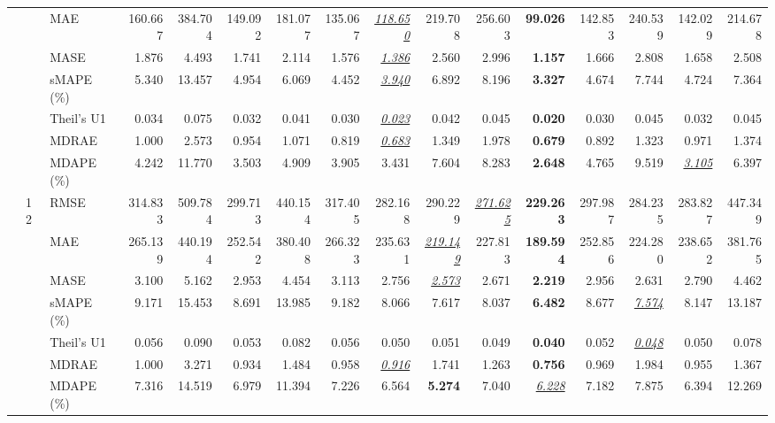 \begin{table}[!htbp]
{\begin{tabular}{lllrrrrrrrrrrrrr}
 &  & MAE & 160.667 & 384.704 & 149.092 & 181.077 & 135.067 & \underline{\textit{118.650}} & 219.708 & 256.603 & \textbf{99.026} & 142.853 & 240.539 & 142.029 & 214.678 \\
 &  & MASE & 1.876 & 4.493 & 1.741 & 2.114 & 1.576 & \underline{\textit{1.386}} & 2.560 & 2.996 & \textbf{1.157} & 1.666 & 2.808 & 1.658 & 2.508 \\
 &  & sMAPE (\%) & 5.340 & 13.457 & 4.954 & 6.069 & 4.452 & \underline{\textit{3.940}} & 6.892 & 8.196 & \textbf{3.327} & 4.674 & 7.744 & 4.724 & 7.364 \\
 &  & Theil's U1 & 0.034 & 0.075 & 0.032 & 0.041 & 0.030 & \underline{\textit{0.023}} & 0.042 & 0.045 & \textbf{0.020} & 0.030 & 0.045 & 0.032 & 0.045 \\
 &  & MDRAE & 1.000 & 2.573 & 0.954 & 1.071 & 0.819 & \underline{\textit{0.683}} & 1.349 & 1.978 & \textbf{0.679} & 0.892 & 1.323 & 0.971 & 1.374 \\
 &  & MDAPE (\%) & 4.242 & 11.770 & 3.503 & 4.909 & 3.905 & 3.431 & 7.604 & 8.283 & \textbf{2.648} & 4.765 & 9.519 & \underline{\textit{3.105}} & 6.397 \\
\cmidrule(lr){2-16}
 & 12 & RMSE & 314.833 & 509.784 & 299.713 & 440.154 & 317.405 & 282.168 & 290.229 & \underline{\textit{271.625}} & \textbf{229.263} & 297.987 & 284.235 & 283.827 & 447.349 \\
 &  & MAE & 265.139 & 440.194 & 252.542 & 380.408 & 266.323 & 235.631 & \underline{\textit{219.149}} & 227.813 & \textbf{189.594} & 252.856 & 224.280 & 238.652 & 381.765 \\
 &  & MASE & 3.100 & 5.162 & 2.953 & 4.454 & 3.113 & 2.756 & \underline{\textit{2.573}} & 2.671 & \textbf{2.219} & 2.956 & 2.631 & 2.790 & 4.462 \\
 &  & sMAPE (\%) & 9.171 & 15.453 & 8.691 & 13.985 & 9.182 & 8.066 & 7.617 & 8.037 & \textbf{6.482} & 8.677 & \underline{\textit{7.574}} & 8.147 & 13.187 \\
 &  & Theil's U1 & 0.056 & 0.090 & 0.053 & 0.082 & 0.056 & 0.050 & 0.051 & 0.049 & \textbf{0.040} & 0.052 & \underline{\textit{0.048}} & 0.050 & 0.078 \\
 &  & MDRAE & 1.000 & 3.271 & 0.934 & 1.484 & 0.958 & \underline{\textit{0.916}} & 1.741 & 1.263 & \textbf{0.756} & 0.969 & 1.984 & 0.955 & 1.367 \\
 &  & MDAPE (\%) & 7.316 & 14.519 & 6.979 & 11.394 & 7.226 & 6.564 & \textbf{5.274} & 7.040 & \underline{\textit{6.228}} & 7.182 & 7.875 & 6.394 & 12.269 \\
\cmidrule(lr){2-16}

\end{tabular}}
\end{table}
